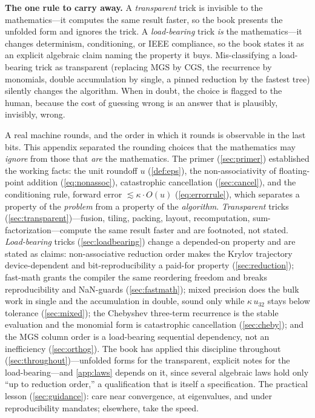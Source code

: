 \begin{keyidea}
\textbf{The one rule to carry away.} A \emph{transparent} trick is invisible to the
mathematics---it computes the same result faster, so the book presents the unfolded
form and ignores the trick. A \emph{load-bearing} trick \emph{is} the
mathematics---it changes determinism, conditioning, or IEEE compliance, so the book
states it as an explicit algebraic claim naming the property it buys. Mis-classifying
a load-bearing trick as transparent (replacing MGS by CGS, the recurrence by
monomials, double accumulation by single, a pinned reduction by the fastest tree)
silently changes the algorithm. When in doubt, the choice is flagged to the human,
because the cost of guessing wrong is an answer that is plausibly, invisibly, wrong.
\end{keyidea}

\summarysection

A real machine rounds, and the order in which it rounds is observable in the last
bits. This appendix separated the rounding choices that the mathematics may
\emph{ignore} from those that \emph{are} the mathematics. The primer
(\cref{sec:primer}) established the working facts: the unit roundoff $u$
(\cref{def:eps}), the non-associativity of floating-point addition
(\cref{eq:nonassoc}), catastrophic cancellation (\cref{sec:cancel}), and the
conditioning rule, forward error $\lesssim \kappa\cdot O(u)$ (\cref{eq:errorrule}),
which separates a property of the \emph{problem} from a property of the
\emph{algorithm}. \emph{Transparent} tricks (\cref{sec:transparent})---fusion,
tiling, packing, layout, recomputation, sum-factorization---compute the same result
faster and are footnoted, not stated. \emph{Load-bearing} tricks
(\cref{sec:loadbearing}) change a depended-on property and are stated as claims:
non-associative reduction order makes the Krylov trajectory device-dependent and
bit-reproducibility a paid-for property (\cref{sec:reduction}); fast-math grants the
compiler the same reordering freedom and breaks reproducibility and NaN-guards
(\cref{sec:fastmath}); mixed precision does the bulk work in single and the
accumulation in double, sound only while $\kappa\,u_{32}$ stays below tolerance
(\cref{sec:mixed}); the Chebyshev three-term recurrence is the stable evaluation and
the monomial form is catastrophic cancellation (\cref{sec:cheby}); and the MGS
column order is a load-bearing sequential dependency, not an inefficiency
(\cref{sec:orthog}). The book has applied this discipline throughout
(\cref{sec:throughout})---unfolded forms for the transparent, explicit notes for the
load-bearing---and \cref{app:laws} depends on it, since several algebraic laws hold
only ``up to reduction order,'' a qualification that is itself a specification. The
practical lesson (\cref{sec:guidance}): care near convergence, at eigenvalues, and
under reproducibility mandates; elsewhere, take the speed.

